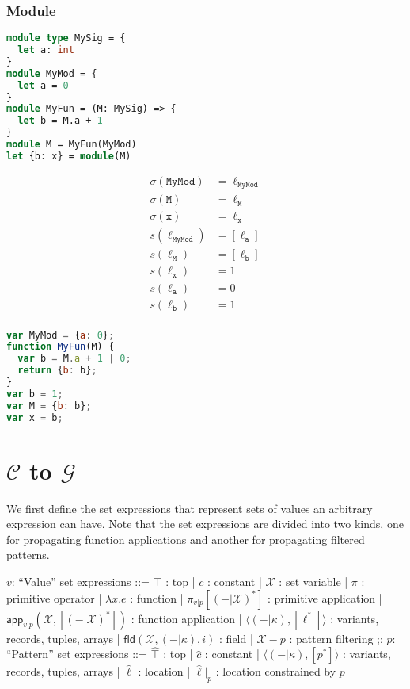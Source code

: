 \documentclass[a4paper]{article}
\newcommand*\vbar{|}
\begin{document}
\subsubsection{Module}
\begin{minipage}[t]{0.5\textwidth}
\begin{lstlisting}[language=Caml]
module type MySig = {
  let a: int
}
module MyMod = {
  let a = 0
}
module MyFun = (M: MySig) => {
  let b = M.a + 1
}
module M = MyFun(MyMod)
let {b: x} = module(M)
\end{lstlisting}
\end{minipage}%
\begin{minipage}[t]{0.5\textwidth}
\begin{align*}
  \sigma(\mathtt{MyMod}) &= \ell_{\mathtt{MyMod}}\\
  \sigma(\mathtt{M}) &= \ell_{\mathtt{M}}\\
  \sigma(\mathtt{x}) &= \ell_{\mathtt{x}}\\
  s(\ell_{\mathtt{MyMod}}) &= [\ell_{\mathtt{a}}]\\
  s(\ell_{\mathtt{M}}) &= [\ell_{\mathtt{b}}]\\
  s(\ell_{\mathtt{x}}) &= 1\\
  s(\ell_{\mathtt{a}}) &= 0\\
  s(\ell_{\mathtt{b}}) &= 1\\
\end{align*}
\end{minipage}

\begin{lstlisting}[language=JavaScript]
var MyMod = {a: 0};
function MyFun(M) {
  var b = M.a + 1 | 0;
  return {b: b};
}
var b = 1;
var M = {b: b};
var x = b;
\end{lstlisting}

\section{$\mathcal{C}$ to $\mathcal{G}$}
We first define the set expressions that represent sets of values an arbitrary expression can have. Note that the set expressions are divided into two kinds, one for propagating function applications and another for propagating filtered patterns.

\begin{bnfgrammar}[rrcll]
$v$: ``Value'' set expressions ::=
   $\top$ : top
  | $c$ : constant
  | $\mathcal{X}$ : set variable
  | $\pi$ : primitive operator
  | $\lambda x.e$ : function
  | $\pi_{v\vbar p}[(-\vbar\mathcal{X})^*]$ : primitive application
  | $\mathsf{app}_{v\vbar p} (\mathcal{X}, [(-\vbar\mathcal{X})^*])$ : function application
  | $\langle(-\vbar\kappa), [\ell^*]\rangle$ : variants, records, tuples, arrays
  | $\mathsf{fld}(\mathcal{X}, (-\vbar\kappa), i)$ : field
  | $\mathcal{X} - p$ : pattern filtering
;;
$p$: ``Pattern'' set expressions ::=
    $\hat \top$ : top
  | $\hat c$ : constant
  | $\langle(-\vbar\kappa),[p^*]\rangle$ : variants, records, tuples, arrays
  | $\hat \ell$ : location
  | $\hat \ell \vbar_{p}$ : location constrained by $p$
\end{bnfgrammar}
\end{document}
